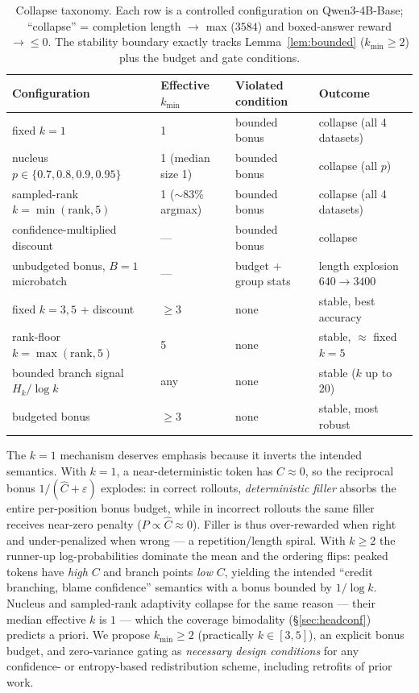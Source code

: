 \documentclass{article} %
\theoremstyle{plain}
\theoremstyle{definition}
\theoremstyle{remark}
\begin{document}
\begin{table}[t]
\caption{Collapse taxonomy. Each row is a controlled configuration on Qwen3-4B-Base; ``collapse'' = completion length $\to$ max ($3584$) and boxed-answer reward $\to \le 0$. The stability boundary exactly tracks Lemma~\ref{lem:bounded} ($k_{\min}\ge2$) plus the budget and gate conditions.}
\label{tab:collapse}
\begin{center}
\small
\begin{tabular}{llll}
\toprule
Configuration & Effective $k_{\min}$ & Violated condition & Outcome \\
\midrule
fixed $k{=}1$ & 1 & bounded bonus & collapse (all 4 datasets) \\
nucleus $p\in\{0.7,0.8,0.9,0.95\}$ & 1 (median size 1) & bounded bonus & collapse (all $p$) \\
sampled-rank $k{=}\min(\mathrm{rank},5)$ & 1 (${\sim}83\%$ argmax) & bounded bonus & collapse (all 4 datasets) \\
confidence-multiplied discount & --- & bounded bonus & collapse \\
unbudgeted bonus, $B{=}1$ microbatch & --- & budget + group stats & length explosion $640{\to}3400$ \\
\midrule
fixed $k{=}3,5$ + discount & $\ge 3$ & none & stable, best accuracy \\
rank-floor $k{=}\max(\mathrm{rank},5)$ & 5 & none & stable, $\approx$ fixed $k{=}5$ \\
bounded branch signal $H_k/\log k$ & any & none & stable ($k$ up to 20) \\
budgeted bonus & $\ge 3$ & none & stable, most robust \\
\bottomrule
\end{tabular}
\end{center}
\end{table}

The $k{=}1$ mechanism deserves emphasis because it inverts the intended semantics. With $k{=}1$, a near-deterministic token has $C\approx 0$, so the reciprocal bonus $1/(\hat C+\varepsilon)$ explodes: in correct rollouts, \emph{deterministic filler} absorbs the entire per-position bonus budget, while in incorrect rollouts the same filler receives near-zero penalty ($P\propto\hat C\approx 0$). Filler is thus over-rewarded when right and under-penalized when wrong --- a repetition/length spiral. With $k\ge2$ the runner-up log-probabilities dominate the mean and the ordering flips: peaked tokens have \emph{high} $C$ and branch points \emph{low} $C$, yielding the intended ``credit branching, blame confidence'' semantics with a bonus bounded by $1/\log k$. Nucleus and sampled-rank adaptivity collapse for the same reason --- their median effective $k$ is $1$ --- which the coverage bimodality (\S\ref{sec:headconf}) predicts a priori. We propose $k_{\min}\ge2$ (practically $k\in[3,5]$), an explicit bonus budget, and zero-variance gating as \emph{necessary design conditions} for any confidence- or entropy-based redistribution scheme, including retrofits of prior work.
\end{document}
